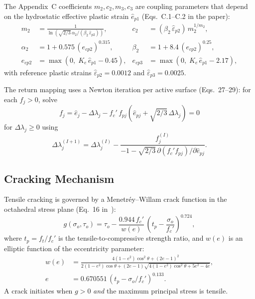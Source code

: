 The Appendix~C coefficients $m_2, c_2, m_3, c_3$ are coupling parameters
that depend on the hydrostatic effective plastic strain $\hat{e}_{p1}$ 
(Eqs.~C.1--C.2 in the paper):
\begin{align}
  m_2 &= \frac{1}{\ln\!\left(\sqrt{2/3}\,\alpha_2 / (\beta_2\,\hat{\varepsilon}_{p2})\right)},
    &  c_2 &= (\beta_2\,\hat{\varepsilon}_{p2})\,m_2^{1/m_2}, \\
  \alpha_2 &= 1 + 0.575\,(e_{cp2})^{0.315}, &
  \beta_2  &= 1 + 8.4\,(e_{cp2})^{0.25}, \\
  e_{cp2}  &= \max(0,\; K_e\,\hat{e}_{p1} - 0.45), &
  e_{cp3}  &= \max(0,\; K_e\,\hat{e}_{p1} - 2.17),
\end{align}
with reference plastic strains $\hat{\varepsilon}_{p2} = 0.0012$ and
$\hat{\varepsilon}_{p3} = 0.0025$.

The return mapping uses a Newton iteration per active surface
(Eqs.~27--29):  for each $f_j > 0$, solve
\[
  f_j = \hat{e}_j - \Delta\lambda_j - f_c'\,f_{pj}(\hat{e}_{pj} + \sqrt{2/3}\,\Delta\lambda_j) = 0
\]
for $\Delta\lambda_j \ge 0$ using
\[
  \Delta\lambda_j^{(I+1)} = \Delta\lambda_j^{(I)} - \frac{f_j^{(I)}}{-1 - \sqrt{2/3}\,\partial(f_c' f_{pj})/\partial\hat{e}_{pj}}.
\]

\subsection{Cracking Mechanism}
\label{ssec:kb-cracking}

Tensile cracking is governed by a Menetr\'ey--Willam crack function in the
octahedral stress plane (Eq.~16 in~\cite{KoBathe2026}):
\begin{equation}
  g(\sigma_o, \tau_o) = \tau_o - \frac{0.944\,f_c'}{w(e)}\,
    \left(t_p - \frac{\sigma_o}{f_c'}\right)^{0.724},
  \label{eq:kb-crack-fn}
\end{equation}
where $t_p = f_t / f_c'$ is the tensile-to-compressive strength ratio, and
$w(e)$ is an elliptic function of the eccentricity parameter:
\begin{align}
  w(e) &= \frac{4(1-e^2)\cos^2\theta + (2e-1)^2}
               {2(1-e^2)\cos\theta + (2e-1)\sqrt{4(1-e^2)\cos^2\theta + 5e^2-4e}},
  \label{eq:kb-w-eccentricity} \\
  e    &= 0.670551\,(t_p - \sigma_o/f_c')^{0.133}.
  \label{eq:kb-eccentricity}
\end{align}
A crack initiates when $g > 0$ \emph{and} the maximum principal stress is
tensile.

